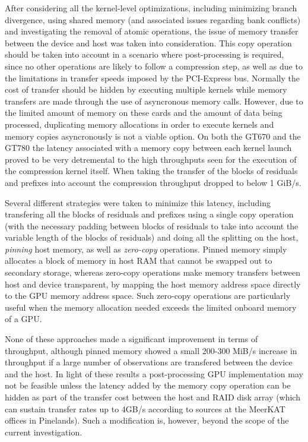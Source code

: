   After considering all the kernel-level optimizations, including minimizing branch divergence, using shared memory (and associated issues regarding bank conflicts) and investigating the removal of atomic 
  operations, the issue of memory transfer between the device and host was taken into consideration. This copy operation should be taken into account in a scenario where post-processing is required, since
  no other operations are likely to follow a compression step, as well as due to the limitations in transfer speeds imposed by the PCI-Express bus. Normally the cost of transfer should be hidden by executing multiple 
  kernels while memory transfers are made through the use of asyncronous memory calls. However, due to the limited amount of memory on these cards and the amount of data being processed, duplicating memory allocations
  in order to execute kernels and memory copies asyncronously is not a viable option. On both the GT670 and the GT780 the latency associated with a memory copy between each kernel launch proved to be very detremental to
  the high throughputs seen for the execution of the compression kernel itself. When taking the transfer of the blocks of residuals and prefixes into account the compression throughput dropped to below 1 GiB/s.
  
  Several different strategies were taken to minimize this latency, including transfering all the blocks of residuals and prefixes using a single copy operation (with the necessary padding between blocks of residuals to
  take into account the variable length of the blocks of residuals) and doing all the splitting on the host, \textit{pinning} host memory, as well as \textit{zero-copy} operations. Pinned memory simply allocates a block 
  of memory in host RAM that cannot be swapped out to secondary storage, whereas zero-copy operations make memory transfers between host and device transparent, by mapping the host memory address space directly to the GPU memory 
  address space. Such zero-copy operations are particularly useful when the memory allocation needed exceeds the limited onboard memory of a GPU. 
  
  None of these approaches made a significant improvement in terms of throughput, although pinned memory showed a small 200-300 MiB/s increase in throughput if a large number of observations are transfered between the 
  device and the host. In light of these results a post-processing GPU implementation may not be feasible unless the latency added by the memory copy operation can be hidden as part of the transfer cost between the host and RAID disk
  array (which can sustain transfer rates up to 4GB/s according to sources at the MeerKAT offices in Pinelands). Such a modification is, however, beyond the scope of the current investigation.
